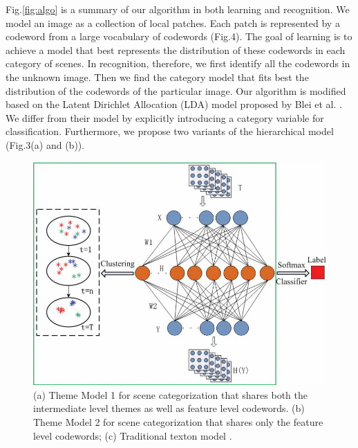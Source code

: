 \documentclass[10pt,a4paper,twocolumn]{article}
\begin{document}
Fig.\ref{fig:algo} is a summary of our algorithm in both learning and recognition. We model an image as a collection of local patches. Each patch is represented by a codeword from a large vocabulary of codewords (Fig.4). The goal of learning is to achieve a model that best represents the distribution of these codewords in each category of scenes. In recognition, therefore, we first identify all the codewords in the unknown image. Then we find the category model that fits best the distribution of the codewords of the particular image. Our algorithm is modified based on the Latent Dirichlet Allocation (LDA) model proposed by Blei et al. \cite{blei}.\\
\hspace{.5cm}We differ from their model by explicitly introducing a category variable for classification. Furthermore, we propose two variants of the hierarchical model (Fig.3(a) and (b)).

\begin{figure}
\includegraphics[scale=.1]{figure_3.jpg}
\caption{(a) Theme Model 1 for scene categorization that
shares both the intermediate level themes as well as feature level
codewords. (b) Theme Model 2 for scene categorization that shares
only the feature level codewords; (c) Traditional texton model \cite{malik, varma}.}
\label{fig:three}
\end{figure}
\end{document}
